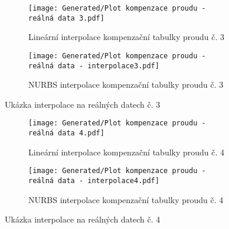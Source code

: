 \begin{landscapeimagepage}
    \begin{figure}[H]
        \centering
        \begin{subfigure}{.5\textheight}
            \centering
            \texttt{[image: Generated/Plot kompenzace proudu - reálná data 3.pdf]}
            \caption{Lineární interpolace kompenzační tabulky proudu č. 3}
            \label{fig:Lineární interpolace kompenzační tabulky proudu č. 3}
        \end{subfigure}
        \hspace{2.5cm}
        \begin{subfigure}{.5\textheight}
            \centering
            \texttt{[image: Generated/Plot kompenzace proudu - reálná data - interpolace3.pdf]}
            \caption{NURBS interpolace kompenzační tabulky proudu č. 3}
            \label{fig:NURBS interpolace kompenzační tabulky proudu č. 3}
        \end{subfigure}
        \caption{Ukázka interpolace na reálných datech č. 3}
        \label{fig: Ukázka interpolace na reálných datech č. 3}
    \end{figure}
    \begin{figure}[H]
        \centering
        \begin{subfigure}{.5\textheight}
            \centering
            \texttt{[image: Generated/Plot kompenzace proudu - reálná data 4.pdf]}
            \caption{Lineární interpolace kompenzační tabulky proudu č. 4}
            \label{fig:Lineární interpolace kompenzační tabulky proudu č. 4}
        \end{subfigure}
        \hspace{2.5cm}
        \begin{subfigure}{.5\textheight}
            \centering
            \texttt{[image: Generated/Plot kompenzace proudu - reálná data - interpolace4.pdf]}
            \caption{NURBS interpolace kompenzační tabulky proudu č. 4}
            \label{fig:NURBS interpolace kompenzační tabulky proudu č. 4}
        \end{subfigure}
        \caption{Ukázka interpolace na reálných datech č. 4}
        \label{fig: Ukázka interpolace na reálných datech č. 4}
    \end{figure}
\end{landscapeimagepage}
